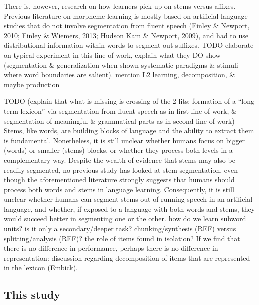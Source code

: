 \documentclass[
  american,
  ,man,floatsintext]{apa6}
\begin{document}
There is, however, research on how learners pick up on stems versus affixes. Previous literature on morpheme learning is mostly based on artificial language studies that do not involve segmentation from fluent speech (Finley \& Newport, 2010; Finley \& Wiemers, 2013; Hudson Kam \& Newport, 2009), and had to use distributional information within words to segment out suffixes. TODO elaborate on typical experiment in this line of work, explain what they DO show (segmentation \& generalization when shown systematic paradigms \& stimuli where word boundaries are salient). mention L2 learning, decomposition, \& maybe production

TODO (explain that what is missing is crossing of the 2 lits: formation of a ``long term lexicon'' via segmentation from fluent speech as in first line of work, \& segmentation of meaningful \& grammatical parts as in second line of work) Stems, like words, are building blocks of language and the ability to extract them is fundamental. Nonetheless, it is still unclear whether humans focus on bigger (words) or smaller (stems) blocks, or whether they process both levels in a complementary way. Despite the wealth of evidence that stems may also be readily segmented, no previous study has looked at stem segmentation, even though the aforementioned literature strongly suggests that humans should process both words and stems in language learning. Consequently, it is still unclear whether humans can segment stems out of running speech in an artificial language, and whether, if exposed to a language with both words and stems, they would succeed better in segmenting one or the other.
how do we learn subword units? is it only a secondary/deeper task? chunking/synthesis (REF) versus splitting/analysis (REF)? the role of items found in isolation? If we find that there is no difference in performance, perhaps there is no difference in representation: discussion regarding decomposition of items that are represented in the lexicon (Embick).

\hypertarget{this-study}{%
\subsection{This study}\label{this-study}}
\end{document}
